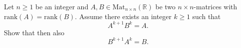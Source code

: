 \begin{problem}
    Let \( n \geq 1 \) be an integer and \( A, B \in \text{Mat}_{n \times n}\left(\mathbb{R}\right) \) be two \( n \times n \)-matrices with \( \text{rank}\left(A\right) = \text{rank}\left(B\right) \). Assume there exists an integer \( k \geq 1 \) such that
    \[A^{k+1}B^k = A.\]
    Show that then also
    \[B^{k+1}A^k = B.\]
\end{problem}
